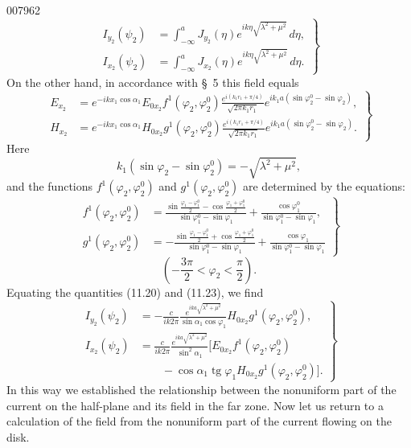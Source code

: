 \begin{scanpage}{0079}{62}
\[
\left.\begin{aligned}
I_{y_2}(\psi_2)&=\int_{-\infty}^a J_{y_2}(\eta)e^{ik\eta\sqrt{\lambda^2+\mu^2}}\,d\eta,\\
I_{x_2}(\psi_2)&=\int_{-\infty}^a J_{x_2}(\eta)e^{ik\eta\sqrt{\lambda^2+\mu^2}}\,d\eta.
\end{aligned}\right\}\tag{11.22}
\]
On the other hand, in accordance with \S\ 5 this field equals
\[
\left.\begin{aligned}
E_{x_2}&=e^{-ikx_1\cos\alpha_1}E_{0x_2}f^1(\varphi_2,\varphi_2^0)\frac{e^{i(k_1r_1+\pi/4)}}{\sqrt{2\pi k_1r_1}}e^{ik_1a(\sin\varphi_2^0-\sin\varphi_2)},\\
H_{x_2}&=e^{-ikx_1\cos\alpha_1}H_{0x_2}g^1(\varphi_2,\varphi_2^0)\frac{e^{i(k_1r_1+\pi/4)}}{\sqrt{2\pi k_1r_1}}e^{ik_1a(\sin\varphi_2^0-\sin\varphi_2)}.
\end{aligned}\right\}\tag{11.23}
\]
Here
\[
k_1(\sin\varphi_2-\sin\varphi_2^0)=-\sqrt{\lambda^2+\mu^2},\tag{11.24}
\]
and the functions $f^1(\varphi_2,\varphi_2^0)$ and $g^1(\varphi_2,\varphi_2^0)$ are determined by the equations:
\[
\left.\begin{aligned}
f^1(\varphi_2,\varphi_2^0)&=\frac{\sin\frac{\varphi_1-\varphi_1^0}{2}-\cos\frac{\varphi_1+\varphi_1^0}{2}}{\sin\varphi_1^0-\sin\varphi_1}+\frac{\cos\varphi_1^0}{\sin\varphi_1^0-\sin\varphi_1},\\
g^1(\varphi_2,\varphi_2^0)&=-\frac{\sin\frac{\varphi_1-\varphi_1^0}{2}+\cos\frac{\varphi_1+\varphi_1^0}{2}}{\sin\varphi_1^0-\sin\varphi_1}+\frac{\cos\varphi_1}{\sin\varphi_1^0-\sin\varphi_1}
\end{aligned}\right\}\tag{11.25}
\]
\[\left(-\frac{3\pi}{2}<\varphi_2<\frac\pi2\right).\]
Equating the quantities (11.20) and (11.23), we find
\[
\left.\begin{aligned}
I_{y_2}(\psi_2)&=-\frac{c}{ik2\pi}\frac{e^{ika\sqrt{\lambda^2+\mu^2}}}{\sin\alpha_1\cos\varphi_1}H_{0x_2}g^1(\varphi_2,\varphi_2^0),\\
I_{x_2}(\psi_2)&=\frac{c}{ik2\pi}\frac{e^{ika\sqrt{\lambda^2+\mu^2}}}{\sin^2\alpha_1}\bigl[E_{0x_2}f^1(\varphi_2,\varphi_2^0)\\
&\qquad-\cos\alpha_1\operatorname{tg}\varphi_1 H_{0x_2}g^1(\varphi_2,\varphi_2^0)\bigr].
\end{aligned}\right\}\tag{11.26}
\]
In this way we established the relationship between the nonuniform part of the current on the half-plane and its field in the far zone. Now let us return to a calculation of the field from the nonuniform part of the current flowing on the disk.
\end{scanpage}

